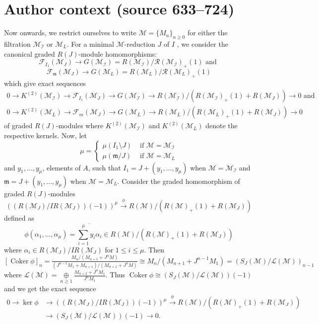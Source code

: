 \documentclass[10pt,a4paper]{amsart}
\def\I{{\mathcal I}}
\def\M{{\mathcal M}}
\newcommand{\m}{\mathfrak m}
\def\F{{\mathcal F}}
\def\L{{\mathcal L}}
\def\R{{\mathcal R}}
\DeclareMathOperator{\coker}{Coker}
\begin{document}
\section*{Author context (source 633--724)}
Now onwards, we restrict ourselves to write $\M=\{M_n\}_{n\geq 0}$ for either the filtration $\M_\I$ or $\M_L$. 
For a minimal $\M$-reduction $J$ of $I$ , we consider the canonical graded $R(J)$-module homomorphisms: $$\F_{I_1}(\M_J)\to G(\M_\I)=R(\M_\I)/\R(\M_\I)_{+}(1) \text{ and }$$  $$\F_{\m}(\M_J)\to G(\M_L)=R(\M_L)/\R(\M_L)_{+}(1)$$ which give  exact sequences 
	\begin{eqnarray} \label{equation:step1}
		0\to K^{(2)}(\M_\I)\to \F_{I_1}(\M_J)\to G(\M_\I)\to R(\M_\I)/(R(\M_\I)_{+}(1)+R(\M_J))\to 0 \text { and }\\
       \label{equation:step1(a)} 0\to K^{(2)}(\M_L)\to \F_{m}(\M_J)\to G(\M_L)\to R(\M_L)/(R(\M_L)_{+}(1)+R(\M_J))\to 0
	\end{eqnarray}    
	of graded $R(J)$-modules where $K^{(2)}(\M_\I)$ and $K^{(2)}(\M_L)$ denote the respective kernels.  Now, let \begin{equation}
    \mu= \begin{cases}
\mu(I_1\setminus J) & \mbox{ if } \M=\M_\I \\  
\mu(\m/J) & \mbox{ if } \M=\M_L 
    \end{cases}
    \end{equation}
and $y_1,\ldots,y_{\mu}$, elements of $A$, such that $I_1=J+(y_1,\ldots,y_\mu)$ when $\M=\M_\I$ and $\m=J+(y_1,\ldots,y_\mu)$ when $\M=\M_L$.  Consider the graded homomorphism of graded $R(J)$-modules $$((R(\M_J)/IR(\M_J))(-1))^\mu\xrightarrow{\phi} R(\M)/(R(\M)_{+}(1)+R(\M_J))$$ defined as
	$$\phi(\alpha_1,\ldots,\alpha_\mu )=\overline{\mathop\sum_{i=1}^\mu y_i\alpha_i  }\in R(\M)/(R(\M)_{+}(1)+R(\M_J))$$
    where $\alpha_i\in R(\M_J)/I R(\M_J)$ for $1\leq i\leq \mu.$ Then 
$[\coker \phi]_n=\frac{M_n/(M_{n+1}+J^nM)}{( J^{n-1}M_1+M_{n+1})/(M_{n+1}+J^nM)}\cong M_n/(M_{n+1}+ J^{n-1}M_1)=(S_J(\M)/\L(\M))_{n-1}$ where $\L(\M)=\mathop\oplus\limits_{n\geq 1}\frac{M_{n+2}+J^{n}M_1}{ J^{n}M_1}$.  Thus 
	$\coker\phi\cong (S_J(\M)/\L(\M))(-1)$ and we get the exact sequence
	\begin{equation}\label{equation:step2}
    \begin{aligned}
        0\to \ker\phi&\to ((R(\M_J)/IR(\M_J)) (-1))^\mu\xrightarrow{\phi} R(\M)/(R(\M)_+(1)+R(\M_J))\\
        &\to (S_J(\M)/\L(\M))(-1)\to 0.
    \end{aligned}
	\end{equation}
\end{document}
